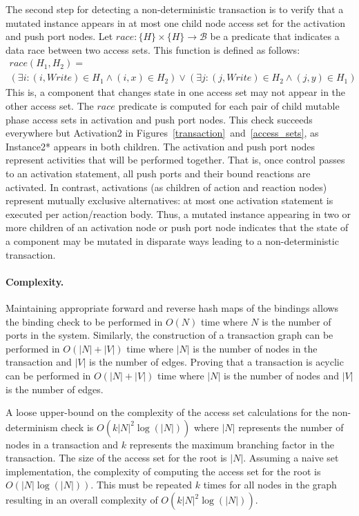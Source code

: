 The second step for detecting a non-deterministic transaction is to verify that a mutated instance appears in at most one child node access set for the activation and push port nodes.
Let $\mathit{race}: \{ H \} \times \{ H \} \to \mathcal{B}$ be a predicate that indicates a data race between two access sets.
This function is defined as follows:
\begin{multline}
  \mathit{race} (H_1, H_2) = \\
  (\exists i : (i, \mathit{Write}) \in H_1 \land (i, x) \in H_2) \lor
  (\exists j : (j, \mathit{Write}) \in H_2 \land (j, y) \in H_1)
\end{multline}
This is, a component that changes state in one access set may not appear in the other access set.
The $\mathit{race}$ predicate is computed for each pair of child mutable phase access sets in activation and push port nodes.
This check succeeds everywhere but Activation2 in Figures~\ref{transaction}~and~\ref{access_sets}, as Instance2* appears in both children.
The activation and push port nodes represent activities that will be performed together.
That is, once control passes to an activation statement, all push ports and their bound reactions are activated.
In contrast, activations (as children of action and reaction nodes) represent mutually exclusive alternatives:  at most one activation statement is executed per action/reaction body.
Thus, a mutated instance appearing in two or more children of an activation node or push port node indicates that the state of a component may be mutated in disparate ways leading to a non-deterministic transaction.

\paragraph{Complexity.}
Maintaining appropriate forward and reverse hash maps of the bindings allows the binding check to be performed in $O(N)$ time where $N$ is the number of ports in the system.
Similarly, the construction of a transaction graph can be performed in $O(|N| + |V|)$ time where $|N|$ is the number of nodes in the transaction and $|V|$ is the number of edges.
Proving that a transaction is acyclic can be performed in $O(|N| + |V|)$ time where $|N|$ is the number of nodes and $|V|$ is the number of edges.

A loose upper-bound on the complexity of the access set calculations for the non-determinism check is $O(k |N|^2 \log (|N|))$ where $|N|$ represents the number of nodes in a transaction and $k$ represents the maximum branching factor in the transaction.
The size of the access set for the root is $|N|$.
Assuming a naive set implementation, the complexity of computing the access set for the root is $O(|N| \log (|N|))$.
This must be repeated $k$ times for all nodes in the graph resulting in an overall complexity of $O(k |N|^2 \log (|N|))$.

